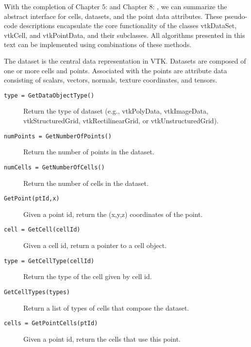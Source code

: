With the completion of Chapter 5:  and Chapter 8: , we can summarize the abstract interface for cells, datasets, and the point data attributes. These pseudo-code descriptions encapsulate the core functionality of the classes vtkDataSet, vtkCell, and vtkPointData, and their subclasses. All algorithms presented in this text can be implemented using combinations of these methods.

\begin{description}[leftmargin=0cm,labelindent=0cm]
\item[Dataset Abstraction.\index{abstraction!dataset|(}\index{dataset!abstraction|(}] The dataset is the central data representation in VTK. Datasets are composed of one or more cells and points. Associated with the points are attribute data consisting of scalars, vectors, normals, texture coordinates, and tensors.
    \begin{description}

    \item[\texttt{type = GetDataObjectType()}]
    Return the type of dataset (e.g., vtkPolyData, vtkImageData, vtkStructuredGrid, vtkRectilinearGrid, or vtkUnstructuredGrid).

    \item[\texttt{numPoints = GetNumberOfPoints()}]
    Return the number of points in the dataset.

    \item[\texttt{numCells = GetNumberOfCells()}]
    Return the number of cells in the dataset.

    \item[\texttt{GetPoint(ptId,x)}]
    Given a point id, return the (x,y,z) coordinates of the point.

    \item[\texttt{cell = GetCell(cellId)}]
    Given a cell id, return a pointer to a cell object.

    \item[\texttt{type = GetCellType(cellId)}]
    Return the type of the cell given by cell id.

    \item[\texttt{GetCellTypes(types)}]
    Return a list of types of cells that compose the dataset.

    \item[\texttt{cells = GetPointCells(ptId)}]
    Given a point id, return the cells that use this point.


\end{description}
\end{description}
